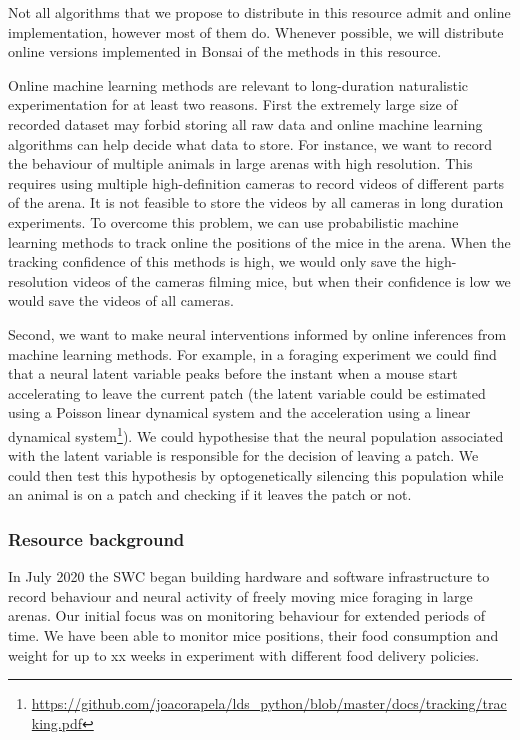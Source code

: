 Not all algorithms that we propose to distribute in this resource admit and
online implementation, however most of them do. Whenever possible, we will
distribute online versions implemented in Bonsai of the methods in this
resource.

Online machine learning methods are relevant to long-duration naturalistic
experimentation for at least two reasons. First the extremely large size of
recorded dataset may forbid storing all raw data and online machine learning
algorithms can help decide what data to store. For instance, we want to record
the behaviour of multiple animals in large arenas with high resolution. This
requires using multiple high-definition cameras to record videos of different
parts of the arena. It is not feasible to store the videos by all cameras in
long duration experiments. To overcome this problem, we can use probabilistic
machine learning methods to track online the positions of the mice in the
arena. When the tracking confidence of this methods is high, we would only save
the high-resolution videos of the cameras filming mice, but when their
confidence is low we would save the videos of all cameras.

Second, we want to make neural interventions informed by online inferences from
machine learning methods. For example, in a foraging experiment we could find
that a neural latent variable peaks before the instant when a mouse start
accelerating to leave the current patch (the latent variable could be estimated
using a Poisson linear dynamical system and the acceleration using a linear
dynamical
system\footnote{\url{https://github.com/joacorapela/lds_python/blob/master/docs/tracking/tracking.pdf}}).
We could hypothesise that the neural population associated with the latent
variable is responsible for the decision of leaving a patch. We could then test
this hypothesis by optogenetically silencing this population while an animal is
on a patch and checking if it leaves the patch or not.

\subsubsection*{Resource background}

In July 2020 the SWC began building hardware and software infrastructure to
record behaviour and neural activity of freely moving mice foraging in large
arenas. Our initial focus was on monitoring behaviour for extended periods of
time. We have been able to monitor mice positions, their food consumption and
weight for up to xx weeks in experiment with different food delivery policies.

